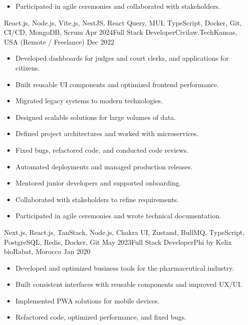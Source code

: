 \begin{experiences}
{\begin{itemize}
                \item Participated in agile ceremonies and collaborated with stakeholders.\\
            \end{itemize}}
            {React.js, Node.js, Vite.js, NestJS, React Query, MUI, TypeScript, Docker, Git, CI/CD, MongoDB, Scrum}
    \emptySeparator
    \experience
        {Apr 2024}{Full Stack Developer}{Civilaw.Tech}{Kansas, USA (Remote / Freelance)}
        {Dec 2022}
            {\begin{itemize}
                \item Developed dashboards for judges and court clerks, and applications for citizens.
                \item Built reusable UI components and optimized frontend performance.
                \item Migrated legacy systems to modern technologies.
                \item Designed scalable solutions for large volumes of data.
                \item Defined project architectures and worked with microservices.
                \item Fixed bugs, refactored code, and conducted code reviews.
                \item Automated deployments and managed production releases.
                \item Mentored junior developers and supported onboarding.
                \item Collaborated with stakeholders to refine requirements.
                \item Participated in agile ceremonies and wrote technical documentation.\\
            \end{itemize}}
            {Next.js, React.js, TanStack, Node.js, Chakra UI, Zustand, BullMQ, TypeScript, PostgreSQL, Redis, Docker, Git}
    \emptySeparator
    \experience
        {May 2023}{Full Stack Developer}{Phi by Kelix bio}{Rabat, Morocco}
        {Jan 2020}
            {\begin{itemize}
                \item Developed and optimized business tools for the pharmaceutical industry.
                \item Built consistent interfaces with reusable components and improved UX/UI.
                \item Implemented PWA solutions for mobile devices.
                \item Refactored code, optimized performance, and fixed bugs.

\end{itemize}}
\end{experiences}
